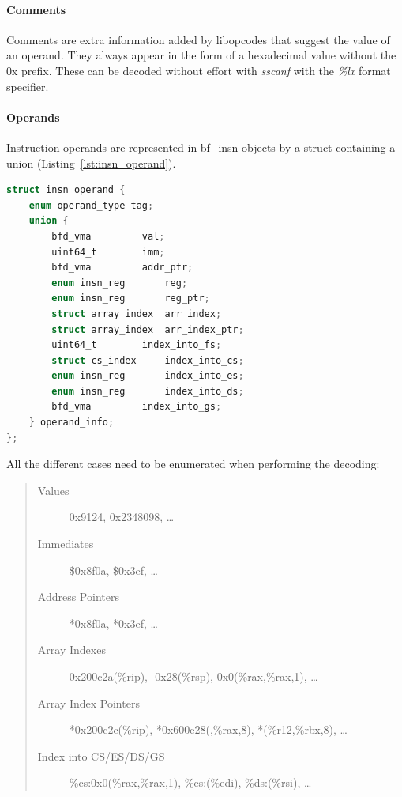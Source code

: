 \paragraph{Comments}

Comments are extra information added by libopcodes that suggest the value of an operand. They always appear in the form of a hexadecimal value without the 0x prefix. These can be decoded without effort with \emph{sscanf} with the \emph{\%lx} format specifier.

\noindent\begin{minipage}{\textwidth}
\paragraph{Operands}

Instruction operands are represented in bf\_insn objects by a struct containing a union (Listing~\ref{lst:insn_operand}).

\noindent\begin{minipage}{\textwidth}
\begin{lstlisting}[language=C,caption={The insn\_operand struct which holds the semantic representation of operands within instructions.},label=lst:insn_operand]
struct insn_operand {
	enum operand_type tag;
	union {
		bfd_vma		    val;
		uint64_t	    imm;
		bfd_vma		    addr_ptr;    
		enum insn_reg	    reg;
		enum insn_reg	    reg_ptr;
		struct array_index  arr_index;
		struct array_index  arr_index_ptr;
		uint64_t	    index_into_fs;
		struct cs_index	    index_into_cs;
		enum insn_reg	    index_into_es;
		enum insn_reg	    index_into_ds;
		bfd_vma		    index_into_gs;
	} operand_info;
};
\end{lstlisting}
\end{minipage}

All the different cases need to be enumerated when performing the decoding:

\begin{quote}
\begin{description}
\item [Values] 0x9124, 0x2348098, \ldots
\item [Immediates] \$0x8f0a, \$0x3ef, \ldots
\item [Address Pointers] *0x8f0a, *0x3ef, \ldots
\item [Array Indexes] 0x200c2a(\%rip), -0x28(\%rsp), 0x0(\%rax,\%rax,1), \ldots
\item [Array Index Pointers] *0x200c2c(\%rip), *0x600e28(,\%rax,8), *(\%r12,\%rbx,8), \ldots
\item [Index into CS/ES/DS/GS] \%cs:0x0(\%rax,\%rax,1), \%es:(\%edi), \%ds:(\%rsi), \ldots


\end{description}
\end{quote}
\end{minipage}
